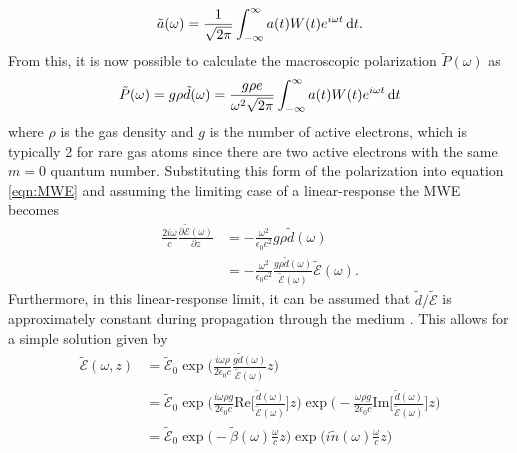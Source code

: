 \begin{equation}
	\tilde{a}(\omega)=\frac{1}{\sqrt{2\pi}}\int_{-\infty}^{\infty}a(t)W(t)e^{i\omega t}\mathop{}\!\mathrm{d} t.
\end{equation}
From this, it is now possible to calculate the macroscopic polarization $\tilde{P}(\omega)$ as 
\begin{equation}
	\tilde{P}(\omega)=g\rho\tilde{d}(\omega)=\frac{g\rho e}{\omega^2\sqrt{2\pi}} \int_{-\infty}^{\infty}a(t)W(t)e^{i\omega t}\mathop{}\!\mathrm{d} t
\end{equation}
where $\rho$ is the gas density and $g$ is the number of active electrons, which is typically 2 for rare gas atoms since there are two active electrons with the same $m=0$ quantum number.  Substituting this form of the polarization into equation \ref{eqn:MWE} and assuming the limiting case of a linear-response the MWE becomes
\begin{equation}
	\label{eqn:MWE_linear_resp}
	\begin{aligned}
		\frac{2i\omega}{c}\frac{\partial \tilde{\mathcal{E}}(\omega)}{\partial z} &= -\frac{\omega^2}{\epsilon_0 c^2} g\rho \tilde{d}(\omega)\\
		& = -\frac{\omega^2}{\epsilon_0 c^2} \frac{g\rho \tilde{d}(\omega)}{\tilde{\mathcal{E}}(\omega)}\tilde{\mathcal{E}}(\omega).
	\end{aligned}
\end{equation}
Furthermore, in this linear-response limit, it can be assumed that $\tilde{d}/\tilde{\mathcal{E}}$ is approximately constant during propagation through the medium \cite{wuTheoryStrongfieldAttosecond2016}.  This allows for a simple solution given by
\begin{equation}
	\label{eqn:E_solution_MWE}
	\begin{aligned}
		\tilde{\mathcal{E}}(\omega,z) &= \tilde{\mathcal{E}}_0 \exp\Bigg({\frac{i\omega\rho}{2\epsilon_0 c} \frac{g\tilde{d}(\omega)}{\tilde{\mathcal{E}}(\omega)} z}\Bigg)\\
		&=\tilde{\mathcal{E}}_0 \exp\Bigg({\frac{i\omega\rho g}{2\epsilon_0 c} \mathrm{Re}\bigg[\frac{\tilde{d}(\omega)}{\tilde{\mathcal{E}}(\omega)}\bigg]z}\Bigg) \exp\Bigg(- {\frac{\omega\rho g}{2\epsilon_0 c} \mathrm{Im}\bigg[\frac{\tilde{d}(\omega)}{\tilde{\mathcal{E}}(\omega)}\bigg]z}\Bigg)\\
		&=\tilde{\mathcal{E}}_0 \exp\bigg(-\tilde{\beta}(\omega)\frac{\omega}{c}z\bigg) \exp\bigg( i\tilde{n}(\omega) \frac{\omega}{c} z\bigg)
	\end{aligned}
\end{equation}
